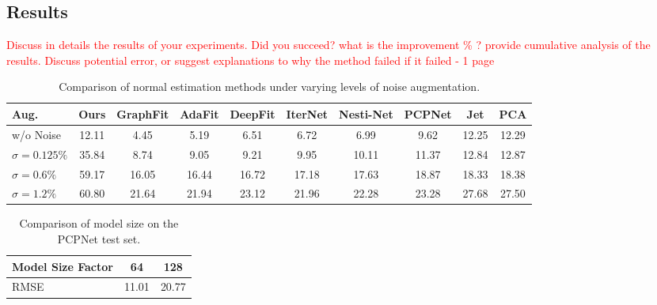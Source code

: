 \documentclass{acmart}
\begin{document}
 \subsection{Results}
 \textcolor{red}{Discuss in details the results of your experiments. Did you succeed? what is the improvement \% ? provide cumulative analysis of the results. Discuss potential error, or suggest explanations to why the method failed if it failed - 
 1 page}

 \begin{table}[ht]
  \centering
  \caption{Comparison of normal estimation methods under varying levels of noise augmentation.}
  \label{tab:noise_comparison}
  \begin{tabular}{lccccccccc}
  \hline
  \textbf{Aug.} & \textbf{Ours} & \textbf{GraphFit} & \textbf{AdaFit} & \textbf{DeepFit} & \textbf{IterNet} & \textbf{Nesti-Net} & \textbf{PCPNet} & \textbf{Jet} & \textbf{PCA} \\ \hline
  w/o Noise & 12.11 & 4.45  & 5.19  & 6.51  & 6.72  & 6.99  & 9.62  & 12.25 & 12.29 \\
  $\sigma = 0.125\%$ & 35.84 & 8.74  & 9.05  & 9.21  & 9.95  & 10.11 & 11.37 & 12.84 & 12.87 \\
  $\sigma = 0.6\%$  & 59.17 & 16.05 & 16.44 & 16.72 & 17.18 & 17.63 & 18.87 & 18.33 & 18.38 \\
  $\sigma = 1.2\%$  & 60.80 & 21.64 & 21.94 & 23.12 & 21.96 & 22.28 & 23.28 & 27.68 & 27.50 \\ \hline
  \end{tabular}
  \end{table}

\begin{table}[ht]
  \centering
  \caption{Comparison of model size on the PCPNet test set.}
  \label{tab:size_comparison}
  \begin{tabular}{lcc}
  \hline
  \textbf{Model Size Factor} & \textbf{64} & \textbf{128} \\ \hline
  RMSE & 11.01 & 20.77 \\ \hline
  \end{tabular}
  \end{table}
\end{document}
